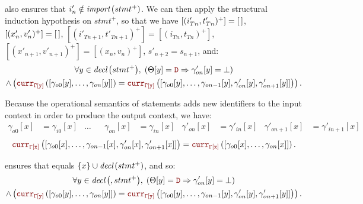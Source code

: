 \begin{skippableproof}
\begin{itemize}
               also ensures that
              $i'_n \notin {\ensuremath{\textit{import}\left(stmt^+\right)}}$. We can then apply the structural induction
              hypothesis on $stmt^+$, so that we have $[(i'_{Tn}, t'_{Tn})^+] = [\,]$,
              $[(x'_n, v'_n)^+] = [\,]$, $[(i'_{Tn+1}, t'_{Tn+1})^+] =
                  [(i_{Tn}, t_{Tn})^+]$, $[(x'_{n+1}, v'_{n+1})^+] = [(x_n, v_n)^+]$,
              $s'_{n+2} = s_{n+1}$, and:
              \begin{multline*}
                  \forall y \in \declSet{stmt^+}, \; \left(\Theta[y] = \dType \Rightarrow \gamma'_{on}[y] = \bot\right) \\
                  \wedge \left(\CurrVal{\tyCtx[y]}{[\gamma_{o0}[y], \dots, \gamma_{on}[y]]} = \CurrVal{\tyCtx[y]}{[\gamma_{o0}[y], \dots, \gamma_{on-1}[y], \gamma'_{on}[y], \gamma'_{on+1}[y]]}\right).
              \end{multline*}

              Because the operational semantics of statements adds new identifiers to the input
              context in order to produce the output context, we have:
              \begin{align*}
                  \gamma_{o0}[x]    & = \gamma_{i0}[x]    &
                  \dots             &                     &
                  \gamma_{on}[x]    & = \gamma_{in}[x]    &
                  \gamma'_{on}[x]   & = \gamma'_{in}[x]   &
                  \gamma'_{on+1}[x] & = \gamma'_{in+1}[x]
              \end{align*}
              \begin{equation*}
                  \CurrVal{\tyCtx[x]}{[\gamma_{o0}[x], \dots, \gamma_{on-1}[x], \gamma'_{on}[x], \gamma'_{on+1}[x]]} = \CurrVal{\tyCtx[x]}{[\gamma_{o0}[x], \dots, \gamma_{on}[x]]}.
              \end{equation*}

               ensures that
               equals $\{x\} \cup {\ensuremath{\textit{decl}\left(stmt^+\right)}}$, and so:
              \begin{multline*}
                  \forall y \in \declSet{, stmt^+}, \; \left(\Theta[y] = \dType \Rightarrow \gamma'_{on}[y] = \bot\right) \\
                  \wedge \left(\CurrVal{\tyCtx[y]}{[\gamma_{o0}[y], \dots, \gamma_{on}[y]]} = \CurrVal{\tyCtx[y]}{[\gamma_{o0}[y], \dots, \gamma_{on-1}[y], \gamma'_{on}[y], \gamma'_{on+1}[y]]}\right).
              \end{multline*}


\end{itemize}
\end{skippableproof}
